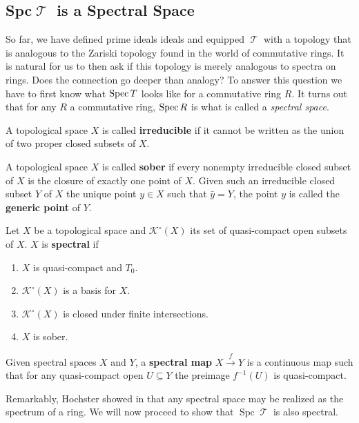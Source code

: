 \documentclass[11pt]{article}
\DeclareMathOperator{\TT}{\mathcal{T}}
\DeclareMathOperator{\spc}{Spc}
\begin{document}
\subsection{Spc\texorpdfstring{$\TT$}{𝓣} is a Spectral Space}

So far, we have defined prime ideals ideals and equipped $\TT$ with a topology that is analogous to the Zariski topology found in the world of commutative rings. It is natural for us to then ask if this topology is merely analogous to spectra on rings. Does the connection go deeper than analogy? To answer this question we have to first know what $\operatorname{Spec} T$ looks like for a commutative ring $R$. It turns out that for any $R$ a commutative ring, $\operatorname{Spec} R$ is what is called a \textit{spectral space}.

\begin{defn}
A topological space $X$ is called \textbf{irreducible} if it cannot be written as the union of two proper closed subsets of $X$.

A topological space $X$ is called \textbf{sober} if every nonempty irreducible closed subset of $X$ is the closure of exactly one point of $X$. Given such an irreducible closed subset $Y$ of $X$ the unique point $y \in X$ such that $\bar y = Y$, the point $y$ is called the \textbf{generic point} of $Y$.
\end{defn}

\begin{defn}
Let $X$ be a topological space and $\mathcal{K}^\circ(X)$ its set of quasi-compact open subsets of $X$. $X$ is \textbf{spectral} if
\begin{enumerate}[1.]
\item $X$ is quasi-compact and $T_0$.
	\item $\mathcal{K}^{\circ}(X)$ is a basis for $X$.
	\item $\mathcal{K}^\circ(X)$ is closed under finite intersections.
	\item $X$ is sober.
\end{enumerate}
Given spectral spaces $X$ and $Y$, a \textbf{spectral map} $X \xrightarrow{f} Y$ is a continuous map such that for any quasi-compact open $U \subseteq Y$ the preimage $f^{-1}(U)$ is quasi-compact.
\end{defn}

Remarkably, Hochster showed in \cite{Hochster:1969} that any spectral space may be realized as the spectrum of a ring. We will now proceed to show that $\spc \TT$ is also spectral.
\end{document}
